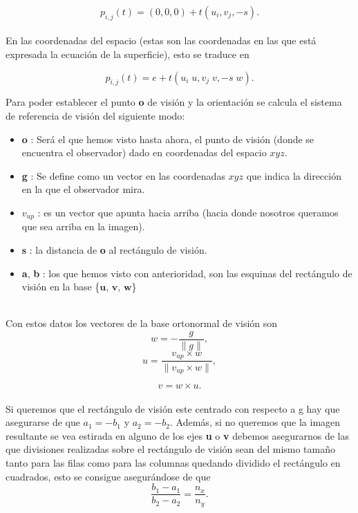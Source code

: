 \[
	p_{i,j}(t) = (0,0,0) + t(u_i , v_j, -s).
\]
${ }$\\

En las coordenadas del espacio (estas son las coordenadas en las que está expresada la ecuación de la superficie), esto se traduce en 

\[
	p_{i,j}(t) = e + t( u_i \; u, v_j \; v, -s \; w).
\]

Para poder establecer el punto \textbf{o} de visión y la orientación se calcula el sistema de referencia de visión del siguiente modo:
\begin{itemize}
	\item \textbf{o} : Será el que hemos visto hasta ahora, el punto de visión (donde se encuentra el observador) dado en coordenadas del espacio $xyz$.
	\item \textbf{g} : Se define como un vector en las coordenadas $xyz$ que indica la dirección en la que el observador mira.
	\item \textbf{$v_{up}$} : es un vector que apunta hacia arriba (hacia donde nosotros queramos que sea arriba en la imagen).
	\item \textbf{s} : la distancia de \textbf{o} al rectángulo de visión.
	\item \textbf{a}, \textbf{b} : los que hemos visto con anterioridad, son las esquinas del rectángulo de visión en la base \{$\textbf{u}$, $\textbf{v}$, $\textbf{w}$\}
\end{itemize}
${ }$\\

Con estos datos los vectores de la base ortonormal de visión son
${ }$\\
	\[
		w = - \frac{g}{\parallel g \parallel},
	\]
	\[
		u = \frac{v_{up} \times w}{\parallel v_{up} \times w \parallel},
	\]
	
	\[
		v = w \times u.
	\]
	${ }$\\
	
Si queremos que el rectángulo de visión este centrado con respecto a g hay que asegurarse de que $a_1 = -b_1$ y $a_2 = -b_2$. Además, si no queremos que la imagen resultante se vea estirada en alguno de los ejes \textbf{u} o \textbf{v} debemos asegurarnos de las que divisiones realizadas sobre el rectángulo de visión sean del mismo tamaño tanto para las filas como para las columnas quedando dividido el rectángulo en cuadrados, esto se consigue asegurándose de que
${ }$\\
	\[
		\frac{b_1-a_1}{b_2 - a_2} = \frac{n_x}{n_y}.
	\]
	${ }$\\

